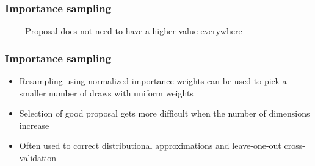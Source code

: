 \documentclass[10pt]{beamer}
\begin{document}
\begin{frame}

\frametitle{Importance sampling}

  \begin{itemize}
     \vspace{-.5\baselineskip}
   \item[-] Proposal does not need to have a higher value everywhere
   \end{itemize}
   \begin{center}
     \vspace{-1\baselineskip}
     \vspace{-1\baselineskip}
   \end{center}

\end{frame}

\begin{frame}

\frametitle{Importance sampling}

  \begin{itemize}
  \item Resampling using normalized importance weights can be used to
    pick a smaller number of draws with uniform weights
    \pause
  \item Selection of good proposal gets more difficult when the
      number of dimensions increase
      \pause
    \item Often used to correct distributional approximations and leave-one-out cross-validation
  \end{itemize}

\end{frame}
\end{document}

